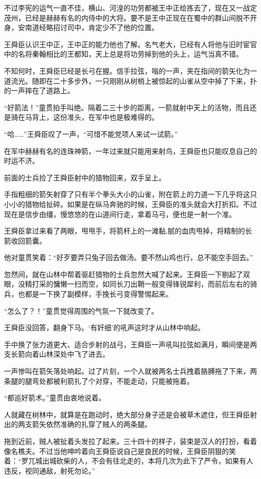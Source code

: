 不过李宪的运气一直不佳，横山、河湟的功劳都被王中正给拣去了，现在又一战定茂州，已经是赫赫有名的内侍中的大将。要不是王中正现在在蜀中的群山间脱不开身，安南道经略招讨司中，肯定少不了他的位置。

王舜臣认识王中正，王中正的能力他也了解。名气老大，已经有人将他与旧时宦官中的名将秦翰相比的王都知，天上总是将功劳掉到他的头上，运气当真不错。

不知何时，王舜臣已经是长弓在握。信手拉弦，嗡的一声，夹在指间的箭矢化为一道流光。随即在二十多步外，一只刚刚从树梢上被惊起的山雀从空中掉了下来，扑的一声摔在了道路上。

“好箭法！”童贯拍手叫绝。隔着二三十步的距离，一箭就射中天上的活物，而且还是骑在马背上，这份准头，在军中也是极难得的。

“哈……”王舜臣叹了一声，“可惜不能党项人来试一试箭。”

在军中赫赫有名的连珠神箭，一年过来就只能用来射鸟，王舜臣也只能叹息自己的时运不济。

前面的士兵捡了王舜臣射中的猎物回来，双手呈上。

手指粗细的箭矢射穿了只有半个拳头大小的山雀，附在箭上的力道一下几乎将这只小小的猎物给扯碎。如果是在纵马奔驰的时候，王舜臣的准头就会大打折扣。不过现在是信步由缰，慢悠悠的在山道间行走，拿着马弓，便也是一射一个准。

王舜臣拿过来看了两眼，甩甩手，将箭杆上的一滩黏.腻的血肉甩掉，将精制的长箭收回箭囊。

他对童贯笑着：“好歹要弄只兔子回去做汤。要不然山鸡也行，总不能空手回去。”

忽然间，就在山林中帮着驱赶猎物的士兵忽然大喊了起来。王舜臣一下剔起了双眼，没精打采的慵懒一扫而空，如同长刀出鞘一般变得锋锐犀利，而前后左右的骑兵，也都是一下换了副模样，手挽长弓变得警惕起来。

“怎么了？！”童贯觉得周围的气氛一下就改变了。

王舜臣没回答，翻身下马。‘有奸细’的吼声这时才从山林中响起。

手中换了张力道更大、适合步射的战弓，王舜臣一声吼叫拉弦如满月，瞬间便是两支长箭向着山林深处中飞了进去。

一声惨叫在箭矢落处响起。过了片刻，一个人就被两名士兵拽着胳膊拖了下来，两条腿的腿弯处都被利箭扎了个对穿，不能走动，只能被拖着。

“都巡好箭术。”童贯由衷地说着。

人就藏在树林中，就算是在跑动时，绝大部分身子还是会被草木遮住，但王舜臣射出的两支箭矢依然准确的扎穿了贼人的两条腿。

拖到近前，贼人被扯着头发拉了起来。三十四十的样子，装束是汉人的打扮，看着像名樵夫。不过当他呻吟着向王舜臣说自己是良民的时候，王舜臣阴狠的笑着：“罗兀城出城砍柴的人，不会有往北走的，本将几次为此下了严令，如果有人违反，视同通敌，射死勿论。”

